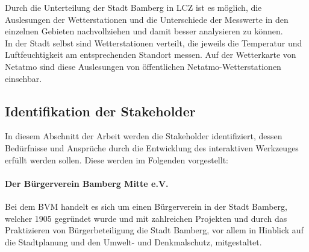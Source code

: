 Durch die Unterteilung der Stadt Bamberg in \ac{LCZ} ist es möglich, die Auslesungen der Wetterstationen und die Unterschiede der Messwerte in den einzelnen Gebieten nachvollziehen und damit besser analysieren zu können. \\ In der Stadt selbst sind Wetterstationen verteilt, die jeweils die Temperatur und Luftfeuchtigkeit am entsprechenden Standort messen. Auf der Wetterkarte von Netatmo sind diese Auslesungen von öffentlichen Netatmo-Wetterstationen einsehbar.

\subsection{Identifikation der Stakeholder}
\label{sec:stakeholder}
In diesem Abschnitt der Arbeit werden die Stakeholder identifiziert, dessen Bedürfnisse und Ansprüche durch die Entwicklung des interaktiven Werkzeuges erfüllt werden sollen. Diese werden im Folgenden vorgestellt:

\paragraph{Der Bürgerverein Bamberg Mitte e.V.}
Bei dem \ac{BVM} handelt es sich um einen Bürgerverein in der Stadt Bamberg, welcher 1905 gegründet wurde und mit zahlreichen Projekten und durch das Praktizieren von Bürgerbeteiligung die Stadt Bamberg, vor allem in Hinblick auf die Stadtplanung und den Umwelt- und Denkmalschutz, mitgestaltet.

